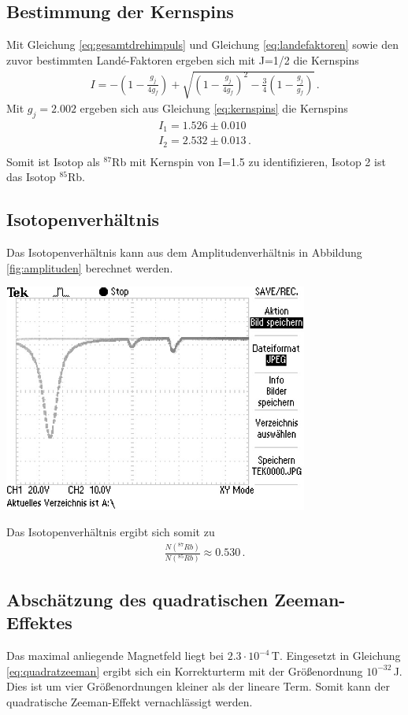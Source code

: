 \documentclass[]{scrartcl}
\begin{document}
\subsection{Bestimmung der Kernspins}
Mit Gleichung \ref{eq:gesamtdrehimpuls} und Gleichung \ref{eq:landefaktoren} sowie den zuvor bestimmten Landé-Faktoren ergeben sich mit J=1/2 die Kernspins
\begin{align}
I=-\left( 1-\frac{g_j}{4g_f}\right) +\sqrt{\left( 1-\frac{g_j}{4g_f}\right)^2-\frac{3}{4}\left( 1-\frac{g_j}{g_f}\right)}\,.
\label{eq:kernspins}
\end{align}
Mit $g_j=2.002$ ergeben sich aus Gleichung \ref{eq:kernspins} die Kernspins
\begin{align*}
I_1= 1.526 \pm 0.010\\
I_2= 2.532 \pm 0.013\,.\\
\end{align*}
Somit ist Isotop  als $^{87}$Rb mit Kernspin von I=1.5 zu identifizieren, Isotop 2 ist das Isotop $^{85}$Rb.

\subsection{Isotopenverhältnis}
Das Isotopenverhältnis kann aus dem Amplitudenverhältnis in Abbildung \ref{fig:amplituden} berechnet werden.
\begin{center}
	\includegraphics[width=10cm]{images/Isotopenverhaeltnis.JPG}
	\label{fig:amplituden}
\end{center}
Das Isotopenverhältnis ergibt sich somit zu
\begin{align*}
\frac{N(^{87}Rb)}{N(^{85}Rb)}\approx0.530\,.
\end{align*}

\subsection{Abschätzung des quadratischen Zeeman-Effektes}
Das maximal anliegende Magnetfeld liegt bei $2.3\cdot10^{-4}$\,T. Eingesetzt in Gleichung \ref{eq:quadratzeeman} ergibt sich ein Korrekturterm mit der Größenordnung $10^{-32}$\,J. Dies ist um vier Grö\ss enordnungen kleiner als der lineare Term. Somit kann der quadratische Zeeman-Effekt vernachlässigt werden. 
\end{document}
